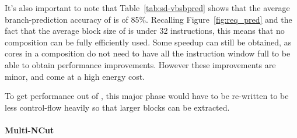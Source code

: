 It's also important to note that Table~\ref{tab:sd-vbsbpred} shows that the average branch-prediction accuracy of  is of 85\%.
Recalling Figure~\ref{fig:req_pred} and the fact that the average block size of  is under 32 instructions, this means that no composition can be fully efficiently used.
Some speedup can still be obtained, as cores in a composition do not need to have all the instruction window full to be able to obtain performance improvements.
However these improvements are minor, and come at a high energy cost.

To get performance out of , this major phase would have to be re-written to be less control-flow heavily so that larger blocks can be extracted.

\paragraph{Multi-NCut}